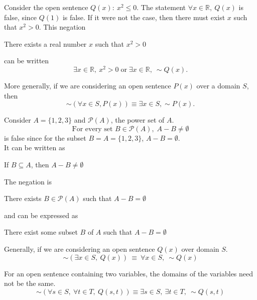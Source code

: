 \begin{eg}
    Consider the open sentence $Q(x):\: x^2 \leq 0$.
    \medbreak
    The statement $\forall x \in \mathbb{R},\: Q(x)$ is false,
     since $Q(1)$ is false. If it were not the case, then there 
     must exist $x$ such that $x^2 > 0$. This negation
     \begin{center}
        There exists a real number $x$ such that $x^2 > 0$
     \end{center}
     can be written
     \begin{equation*}
        \exists x \in \mathbb{R},\: x^2 > 0 \;\text{or}\; 
        \exists x \in \mathbb{R},\: \sim Q(x).
     \end{equation*}
\end{eg}
More generally, if we are considering an open sentence $P(x)$ 
over a domain $S$, then
\begin{equation*}
    \sim (\forall x \in S, P(x)) \equiv \exists x \in S, \sim P(x).
\end{equation*}
\begin{eg}
    Consider $A=\{1,2,3\}$ and $\mathcal{P}(A)$, the power set of $A$.
    \begin{equation*}
         \text{For every set } B \in \mathcal{P}(A),\; A-B \neq \emptyset
    \end{equation*}
    is false since for the subset $B=A=\{1,2,3\}$, $A-B = \emptyset$. \\[1.5ex]
    It can be written as
    \begin{center}
         If $B \subseteq A$, then $A-B \neq \emptyset$ 
    \end{center}
    The negation is 
    \begin{center}
         There exists $B \in \mathcal{P}(A)$ such that $A-B = \emptyset$
    \end{center}
    and can be expressed as
    \begin{center}
         There exist some subset $B$ of $A$ such that $A-B = \emptyset$
    \end{center}
\end{eg}
Generally, if we are considering an open sentence $Q(x)$ over domain $S$.
\begin{equation*}
     \sim (\exists x \in S,\: Q(x))\: \equiv \: \forall x \in S,\: \sim Q(x)
\end{equation*}

For an open sentence containing two variables, the domains of 
the variables need not be the same.
\begin{equation*}
    \sim (\forall s \in S,\: \forall t \in T,\:Q(s,t)) 
    \equiv \exists s \in S,\: \exists t \in T,\: \sim Q(s,t)
\end{equation*}

